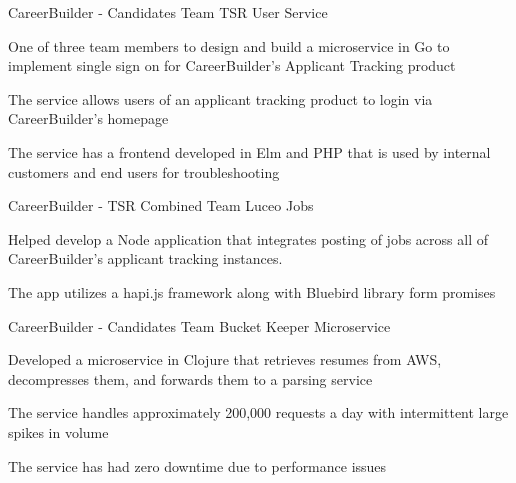 \begin{cventries}
\cventry
  	{CareerBuilder - Candidates Team} %
    {TSR User Service} %
    {} %
    {} %
    {
      \begin{cvitems} %
        \item {One of three team members to design and build a microservice in Go to implement single sign on for CareerBuilder's Applicant Tracking product}  
        \item {The service allows users of an applicant tracking product to login via CareerBuilder's homepage}
        \item {The service has a frontend developed in Elm and PHP that is used by internal customers and end users for troubleshooting} 
      \end{cvitems}
    }

  \cventry
  	{CareerBuilder - TSR Combined Team} %
    {Luceo Jobs} %
    {} %
    {} %
    {
      \begin{cvitems} %
        \item {Helped develop a Node application that integrates posting of jobs across all of CareerBuilder's applicant tracking instances.}  
        \item {The app utilizes a hapi.js framework along with Bluebird library form promises}
      \end{cvitems}
    }

  \cventry
  	{CareerBuilder - Candidates Team} %
    {Bucket Keeper Microservice} %
    {} %
    {} %
    {
      \begin{cvitems} %
        \item {Developed a microservice in Clojure that retrieves resumes from AWS, decompresses them, and forwards them to a parsing service}  
        \item {The service handles approximately 200,000 requests a day with intermittent large spikes in volume}
        \item {The service has had zero downtime due to performance issues} 
      \end{cvitems}
    }


\end{cventries}
